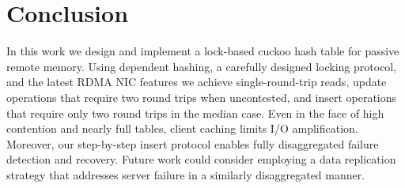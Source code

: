 \section{Conclusion}
\label{sec:conclusion}

In this work we design and implement a lock-based cuckoo hash table
for passive remote memory. Using dependent hashing, a carefully
designed locking protocol, and the latest RDMA NIC features we achieve
single-round-trip reads, update operations that require two round
trips when uncontested, and insert operations that require only two
round trips in the median case.  Even in the face of high contention
and nearly full tables, client caching limits I/O amplification.
Moreover, our step-by-step insert protocol enables fully disaggregated
failure detection and recovery.  Future work could consider employing
a data replication strategy that addresses server failure in a
similarly disaggregated manner.
